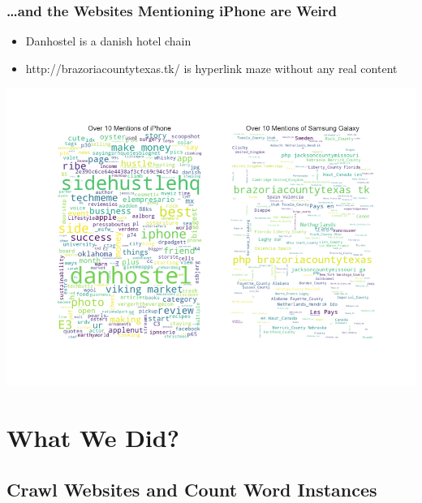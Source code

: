 \documentclass[10pt]{beamer}
\begin{document}
\begin{frame}
\frametitle{\ldots and the Websites Mentioning iPhone are Weird}

\begin{itemize}
    \item Danhostel is a danish hotel chain
    \item http://brazoriacountytexas.tk/ is hyperlink maze without any real content
\end{itemize}

{
    \centering
    \includegraphics[width=\textwidth,height=\textheight,keepaspectratio]{wordclouds_for_sites_with_lots_of_mentions.png}
    \par
}

\end{frame}

\section{What We Did?}


\subsection{Crawl Websites and Count Word Instances}
\end{document}
